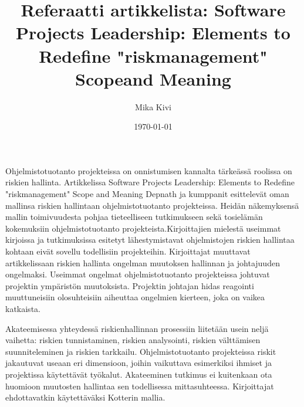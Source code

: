 \documentclass[finnish]{tktltiki2}
\title{Referaatti artikkelista: Software Projects Leadership: Elements to Redefine "riskmanagement" Scopeand Meaning}
\author{Mika Kivi}
\date{\today}
\theoremstyle{definition}
\theoremstyle{remark}
\begin{document}

\maketitle        %






Ohjelmistotuotanto projekteissa on onnistumisen kannalta tärkeässä roolissa on riskien hallinta. Artikkelissa Software Projects Leadership: Elements to Redefine "riskmanagement" Scope and Meaning Depnath ja kumppanit esittelevät oman mallinsa riskien hallintaan ohjelmistotuotanto projekteissa. Heidän näkemyksensä mallin toimivuudesta pohjaa tieteelliseen tutkimukseen sekä tosielämän kokemuksiin ohjelmistotuotanto projekteista.Kirjoittajien mielestä useimmat kirjoissa ja tutkimuksissa esitetyt lähestymistavat ohjelmistojen riskien hallintaa kohtaan eivät sovellu todellisiin projekteihin. Kirjoittajat muuttavat artikkelissaan riskien hallinta ongelman muutoksen hallinnan ja johtajuuden ongelmaksi. Useimmat ongelmat ohjelmistotuotanto projekteissa johtuvat projektin ympäristön muutoksista.  Projektin johtajan hidas reagointi muuttuneisiin olosuhteisiin aiheuttaa ongelmien kierteen, joka on vaikea katkaista.

Akateemisessa yhteydessä riskienhallinnan prosessiin liitetään usein neljä vaihetta: riskien tunnistaminen, riskien analysointi, riskien välttämisen suunniteleminen ja riskien tarkkailu. Ohjelmistotuotanto projekteissa riskit jakautuvat useaan eri dimensioon, joihin vaikuttava esimerkiksi ihmiset ja projektissa käytettävät työkalut. Akateeminen tutkimus ei kuitenkaan ota huomioon muutosten hallintaa sen todellisessa mittasuhteessa. Kirjoittajat ehdottavatkin käytettäväksi Kotterin mallia. 
\end{document}
